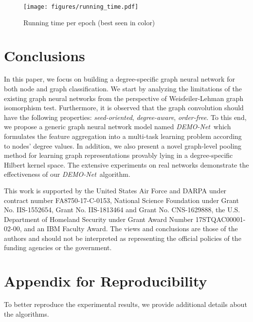\documentclass[sigconf]{acmart}
\newcommand{\demonet}{{\emph {DEMO-Net}}}
\begin{document}
\begin{figure}
\texttt{[image: figures/running\_time.pdf]}
\caption{Running time per epoch (best seen in color)}
\label{running_time}
\vspace{-3mm}
\end{figure}

\section{Conclusions}
In this paper, we focus on building a degree-specific graph neural network for both node and graph classification. We start by analyzing the limitations of the existing graph neural networks from the perspective of Weisfeiler-Lehman graph isomorphism test. Furthermore, it is observed that the graph convolution should have the following properties: {\em seed-oriented}, {\em degree-aware}, {\em order-free}. To this end, we propose a generic graph neural network model named \demonet\, which formulates the feature aggregation into a multi-task learning problem according to nodes' degree values. In addition, we also present a novel graph-level pooling method for learning graph representations provably lying in a degree-specific Hilbert kernel space. The extensive experiments on real networks demonstrate the effectiveness of our \demonet\ algorithm.















\begin{acks}
This work is supported by the United States Air Force and DARPA under contract number FA8750-17-C-0153, National Science Foundation under Grant No. IIS-1552654, Grant No.
IIS-1813464 and Grant No. CNS-1629888, the U.S. Department of Homeland Security
under Grant Award Number 17STQAC00001-02-00, and an IBM Faculty Award. The views and conclusions are those of the authors and should not be interpreted as representing
the official policies of the funding agencies or the government.
\end{acks} 


\clearpage
\appendix
\section{Appendix for Reproducibility}
To better reproduce the experimental results, we provide additional details about the algorithms.
\end{document}
